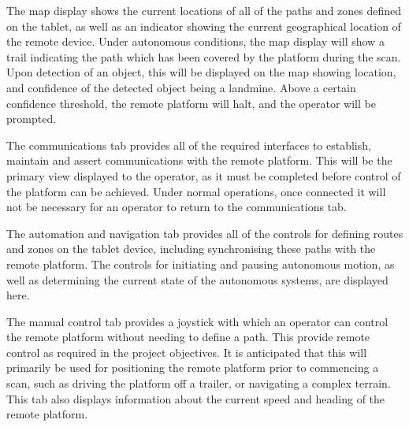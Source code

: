 \documentclass[main.tex]{subfiles}
\begin{document}
The map display shows the current locations of all of the paths and zones defined on the tablet, as well as an indicator showing the current geographical location of the remote device. Under autonomous conditions, the map display will show a trail indicating the path which has been covered by the platform during the scan. Upon detection of an object, this will be displayed on the map showing location, and confidence of the detected object being a landmine. Above a certain confidence threshold, the remote platform will halt, and the operator will be prompted.

The communications tab provides all of the required interfaces to establish, maintain and assert communications with the remote platform. This will be the primary view displayed to the operator, as it must be completed before control of the platform can be achieved. Under normal operations, once connected it will not be necessary for an operator to return to the communications tab.

The automation and navigation tab provides all of the controls for defining routes and zones on the tablet device, including synchronising these paths with the remote platform. The controls for initiating and pausing autonomous motion, as well as determining the current state of the autonomous systems, are displayed here.

The manual control tab provides a joystick with which an operator can control the remote platform without needing to define a path. This provide remote control as required in the project objectives. It is anticipated that this will primarily be used for positioning the remote platform prior to commencing a scan, such as driving the platform off a trailer, or navigating a complex terrain. This tab also displays information about the current speed and heading of the remote platform. 
\end{document}
